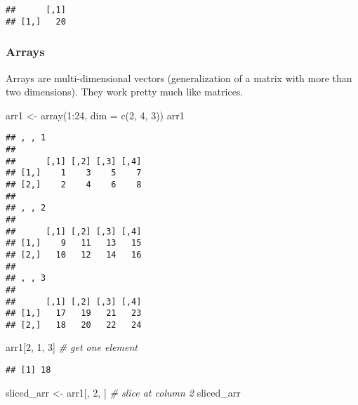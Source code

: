\documentclass[
  oneside]{book}
\newenvironment{Shaded}{\begin{snugshade}}{\end{snugshade}}
\newcommand{\AttributeTok}[1]{\textcolor[rgb]{0.77,0.63,0.00}{#1}}
\newcommand{\CommentTok}[1]{\textcolor[rgb]{0.56,0.35,0.01}{\textit{#1}}}
\newcommand{\DecValTok}[1]{\textcolor[rgb]{0.00,0.00,0.81}{#1}}
\newcommand{\FunctionTok}[1]{\textcolor[rgb]{0.00,0.00,0.00}{#1}}
\newcommand{\NormalTok}[1]{#1}
\newcommand{\OtherTok}[1]{\textcolor[rgb]{0.56,0.35,0.01}{#1}}
\newcommand{\SpecialCharTok}[1]{\textcolor[rgb]{0.00,0.00,0.00}{#1}}
\begin{document}
\begin{verbatim}
##      [,1]
## [1,]   20
\end{verbatim}

\hypertarget{arrays}{%
\subsubsection{Arrays}\label{arrays}}

Arrays are multi-dimensional vectors (generalization
of a matrix with more than two dimensions).
They work pretty much like matrices.

\begin{Shaded}
\begin{Highlighting}[]
\NormalTok{arr1 }\OtherTok{\textless{}{-}} \FunctionTok{array}\NormalTok{(}\DecValTok{1}\SpecialCharTok{:}\DecValTok{24}\NormalTok{, }\AttributeTok{dim =} \FunctionTok{c}\NormalTok{(}\DecValTok{2}\NormalTok{, }\DecValTok{4}\NormalTok{, }\DecValTok{3}\NormalTok{))}
\NormalTok{arr1}
\end{Highlighting}
\end{Shaded}

\begin{verbatim}
## , , 1
## 
##      [,1] [,2] [,3] [,4]
## [1,]    1    3    5    7
## [2,]    2    4    6    8
## 
## , , 2
## 
##      [,1] [,2] [,3] [,4]
## [1,]    9   11   13   15
## [2,]   10   12   14   16
## 
## , , 3
## 
##      [,1] [,2] [,3] [,4]
## [1,]   17   19   21   23
## [2,]   18   20   22   24
\end{verbatim}

\begin{Shaded}
\begin{Highlighting}[]
\NormalTok{arr1[}\DecValTok{2}\NormalTok{, }\DecValTok{1}\NormalTok{, }\DecValTok{3}\NormalTok{] }\CommentTok{\# get one element}
\end{Highlighting}
\end{Shaded}

\begin{verbatim}
## [1] 18
\end{verbatim}

\begin{Shaded}
\begin{Highlighting}[]
\NormalTok{sliced\_arr }\OtherTok{\textless{}{-}}\NormalTok{ arr1[, }\DecValTok{2}\NormalTok{, ] }\CommentTok{\# slice at column 2}
\NormalTok{sliced\_arr}
\end{Highlighting}
\end{Shaded}
\end{document}
